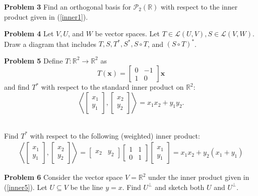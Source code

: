 \documentclass[12pt]{article}
\newcommand{\problem}[1]{\hspace{-4 ex} \large \textbf{Problem #1} }
\newcommand{\RR}{\mathbb{R}}
\newcommand{\PP}{\mathcal{P}}
\newcommand{\LL}{\mathcal{L}}
\renewcommand{\vec}[1]{\boldsymbol{\mathbf{#1}}}
\begin{document}
\pagebreak
\problem{3} Find an orthogonal basis for $\PP_2(\RR)$ with respect to the inner product given in (\ref{inner1}).


\pagebreak
\problem{4} Let $V, U$, and $W$ be vector spaces. Let $T \in \LL(U,V), S \in \LL(V,W)$. Draw a diagram that includes $T, S, T^*, S^*, S \circ T$, and $(S \circ T)^*$.

\pagebreak
\problem{5} Define $T: \RR^2 \to \RR^2$ as 
$$
T(\vec{x}) = \begin{bmatrix}0&-1\\1&0\end{bmatrix}\vec{x}
$$
and find $T^*$ with respect to the standard inner product on $\RR^2$:
$$
\left\langle \begin{bmatrix}x_1\\y_1\end{bmatrix}, \begin{bmatrix}x_2\\y_2\end{bmatrix} \right \rangle = x_1x_2 + y_1y_2.
$$
\ 
\bigbreak \ 
\bigbreak \ 
\bigbreak \ 
\bigbreak \ 

Find $T^*$ with respect to the following (weighted) inner product:
\begin{align}
\left\langle \begin{bmatrix}x_1\\y_1\end{bmatrix}, \begin{bmatrix}x_2\\y_2\end{bmatrix} \right \rangle =
\begin{bmatrix}x_2&y_2\end{bmatrix}
\begin{bmatrix}1&1\\0&1\end{bmatrix}
\begin{bmatrix}x_1 \\ y_1 \end{bmatrix}
= x_{1} x_{2} + y_{2} \left(x_{1} + y_{1}\right) \label{inner5}
\end{align}

\pagebreak
\problem{6} Consider the vector space $V=\RR^2$ under the inner product given in (\ref{inner5}). Let $U\subseteq V$ be the line $y = x$. Find $U^\perp$ and sketch both $U$ and $U^\perp$.
\end{document}
